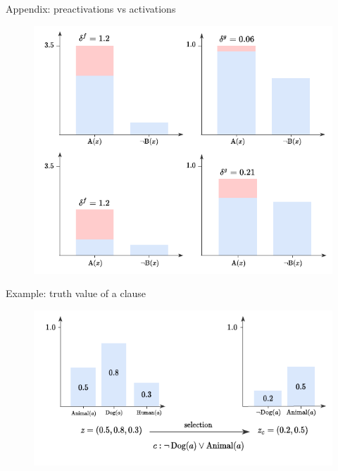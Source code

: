 \documentclass{beamer}
\begin{document}
\begin{frame}{Appendix: preactivations vs activations}
	\begin{figure}
		\includegraphics[width=0.75\linewidth]{images/preac_deltas_example.pdf}
	\end{figure}
\end{frame}

\begin{frame}{Example: truth value of a clause}
	\begin{figure}
		\includegraphics[width=\linewidth]{images/example_clause_boosting0.pdf}
	\end{figure}
\end{frame}
\end{document}
